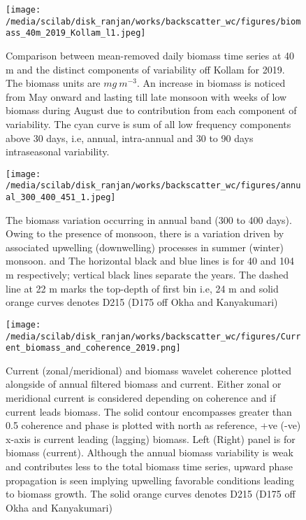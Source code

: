 \documentclass{article}
\begin{document}
\begin{figure}[htbp]
	\centering
	\texttt{[image: /media/scilab/disk\_ranjan/works/backscatter\_wc/figures/biomass\_40m\_2019\_Kollam\_l1.jpeg]} 
	\captionsetup{justification=justified,font=footnotesize,skip=0.05\baselineskip,width=\textwidth}
	\caption{Comparison between mean-removed daily biomass time series at 40 m and the distinct components of variability off Kollam for 2019. The biomass units are $mg \ m^{-3}$. An increase in biomass is noticed from May onward and lasting till late monsoon with weeks of low biomass during August due to contribution from each component of variability. The cyan curve is sum of all low frequency components above 30 days, i.e, annual, intra-annual and 30 to 90 days intraseasonal variability.}
	\label{fig:variability}
\end{figure}

\begin{figure}[htbp]
	\centering
	\texttt{[image: /media/scilab/disk\_ranjan/works/backscatter\_wc/figures/annual\_300\_400\_451\_1.jpeg]} 
	\captionsetup{justification=justified,font=footnotesize,skip=0.05\baselineskip,width=\textwidth}
	\caption{The biomass variation occurring in annual band (300 to 400 days). Owing to the presence of monsoon, there is a variation driven by associated upwelling (downwelling) processes in summer (winter) monsoon. and The horizontal black and blue lines is for 40 and 104 m respectively; vertical black lines separate the years. The dashed line at 22 m marks the top-depth of first bin i.e, 24 m and solid orange curves denotes D215 (D175 off Okha and Kanyakumari)}
	\label{fig:annual}
\end{figure}

\begin{figure}[htbp]
	\centering
	\texttt{[image: /media/scilab/disk\_ranjan/works/backscatter\_wc/figures/Current\_biomass\_and\_coherence\_2019.png]} 
	\captionsetup{justification=justified,font=footnotesize,skip=0.05\baselineskip,width=\textwidth}
	\caption{Current (zonal/meridional) and biomass wavelet coherence plotted alongside of annual filtered biomass and current. Either zonal or meridional current is considered depending on coherence and if current leads biomass. The solid contour encompasses greater than 0.5 coherence and phase is plotted with north as reference, +ve (-ve) x-axis is current leading (lagging) biomass. Left (Right) panel is for biomass (current). Although the annual biomass variability is weak and contributes less to the total biomass time series, upward phase propagation is seen implying upwelling favorable conditions leading to biomass growth. The solid orange curves denotes D215 (D175 off Okha and Kanyakumari)}
	\label{fig:biomasscurrentcoh}
\end{figure}
\end{document}
